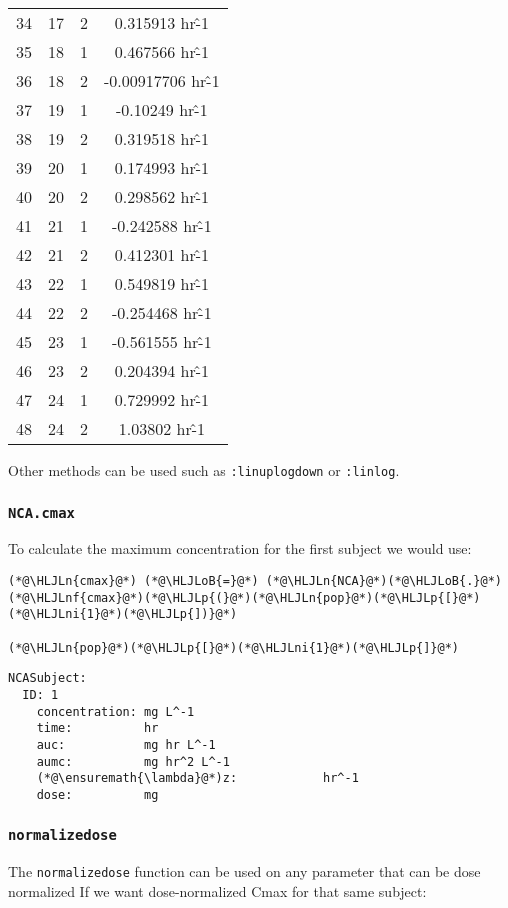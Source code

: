 \documentclass[12pt,a4paper]{article}
\newcommand{\HLJLn}[1]{#1}
\newcommand{\HLJLnf}[1]{\textcolor[RGB]{66,102,213}{#1}}
\newcommand{\HLJLni}[1]{\textcolor[RGB]{59,151,46}{#1}}
\newcommand{\HLJLoB}[1]{\textcolor[RGB]{102,102,102}{\textbf{#1}}}
\newcommand{\HLJLp}[1]{#1}
\begin{document}
\begin{tabular}{r|ccc}
	34 & 17 & 2 & 0.315913 hr\^-1 \\
	35 & 18 & 1 & 0.467566 hr\^-1 \\
	36 & 18 & 2 & -0.00917706 hr\^-1 \\
	37 & 19 & 1 & -0.10249 hr\^-1 \\
	38 & 19 & 2 & 0.319518 hr\^-1 \\
	39 & 20 & 1 & 0.174993 hr\^-1 \\
	40 & 20 & 2 & 0.298562 hr\^-1 \\
	41 & 21 & 1 & -0.242588 hr\^-1 \\
	42 & 21 & 2 & 0.412301 hr\^-1 \\
	43 & 22 & 1 & 0.549819 hr\^-1 \\
	44 & 22 & 2 & -0.254468 hr\^-1 \\
	45 & 23 & 1 & -0.561555 hr\^-1 \\
	46 & 23 & 2 & 0.204394 hr\^-1 \\
	47 & 24 & 1 & 0.729992 hr\^-1 \\
	48 & 24 & 2 & 1.03802 hr\^-1 \\
\end{tabular}


Other methods can be used such as \texttt{:linuplogdown} or \texttt{:linlog}.

\subsubsection{\texttt{NCA.cmax}}
To calculate the maximum concentration for the first subject we would use:


\begin{lstlisting}
(*@\HLJLn{cmax}@*) (*@\HLJLoB{=}@*) (*@\HLJLn{NCA}@*)(*@\HLJLoB{.}@*)(*@\HLJLnf{cmax}@*)(*@\HLJLp{(}@*)(*@\HLJLn{pop}@*)(*@\HLJLp{[}@*)(*@\HLJLni{1}@*)(*@\HLJLp{])}@*)

(*@\HLJLn{pop}@*)(*@\HLJLp{[}@*)(*@\HLJLni{1}@*)(*@\HLJLp{]}@*)
\end{lstlisting}

\begin{lstlisting}
NCASubject:
  ID: 1
    concentration: mg L^-1
    time:          hr
    auc:           mg hr L^-1
    aumc:          mg hr^2 L^-1
    (*@\ensuremath{\lambda}@*)z:            hr^-1
    dose:          mg
\end{lstlisting}


\subsubsection{\texttt{normalizedose}}
The \texttt{normalizedose} function can be used on any parameter that can be dose normalized If we want dose-normalized Cmax for that same subject:
\end{document}
